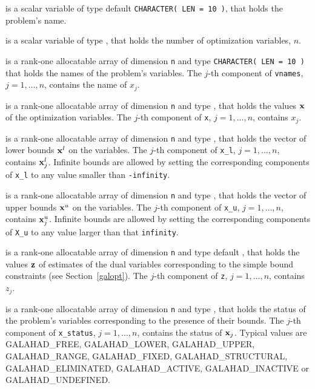 \documentclass{galahad}
\newcommand{\sym}{\sf\small}
\begin{document}
\begin{description}
 is a scalar variable of type default {\tt CHARACTER( LEN = 10 )},
that holds the problem's name.

 is a scalar variable of type \integer, 
 that holds the number of optimization variables, $n$.  

 is a rank-one allocatable array of dimension {\tt n} and type 
{\tt CHARACTER( LEN = 10 )} that holds the names of the problem's
variables. The $j$-th component of {\tt vnames}, $j = 1,  \ldots , n$, 
contains the name of $x_{j}$.  
              
 is a rank-one allocatable array of dimension {\tt n} and type 
\realdp, 
that holds the values ${\mathbf{x}}$ of the optimization variables.
The $j$-th component of {\tt x}, $j = 1,  \ldots , n$, contains $x_{j}$.  

 is a rank-one allocatable array of dimension {\tt n} and type 
\realdp, that holds
the vector of lower bounds ${\mathbf{x}}^{l}$ on the variables.
The $j$-th component of {\tt x\_l}, $j = 1, \ldots , n$, 
contains ${\mathbf{x}}_{j}^{l}$.
Infinite bounds are allowed by setting the corresponding 
components of {\tt x\_l} to any value smaller than {\tt -infinity}.

 is a rank-one allocatable array of dimension {\tt n} and type 
\realdp, that holds
the vector of upper bounds ${\mathbf{x}}^{u}$ on the variables.
The $j$-th component of {\tt x\_u}, $j = 1, \ldots , n$, 
contains ${\mathbf{x}}_{j}^{u}$.
Infinite bounds are allowed by setting the corresponding 
components of {\tt X\_u} to any value larger than that {\tt infinity}. 

 is a rank-one allocatable array of dimension {\tt n} and type default 
\realdp, that holds
the values ${\mathbf{z}}$ of estimates  of the dual variables 
corresponding to the simple bound constraints (see Section~\ref{galopt}).
The $j$-th component of {\tt z}, $j = 1,  \ldots ,  n$, contains $z_{j}$.  

 is  a rank-one allocatable array of dimension {\tt n} and type 
\integer, that holds the status of the problem's variables
corresponding to the presence of their bounds. The $j$-th component of 
{\tt x\_status}, $j = 1,  \ldots ,  n$, contains the status of ${\mathbf{x}}_j$.
Typical values are
{\sym GALAHAD\_FREE},  {\sym GALAHAD\_LOWER}, {\sym GALAHAD\_UPPER},
{\sym GALAHAD\_RANGE}, {\sym GALAHAD\_FIXED}, {\sym GALAHAD\_STRUCTURAL},
{\sym GALAHAD\_ELIMINATED}, {\sym GALAHAD\_ACTIVE}, 
{\sym GALAHAD\_INACTIVE} or {\sym GALAHAD\_UNDEFINED}.
        

\end{description}
\end{document}

